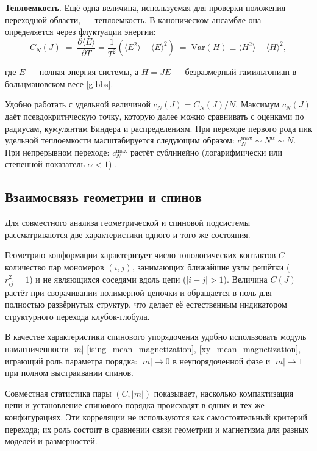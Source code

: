  
    \textbf{Теплоемкость}. 
 Ещё одна величина, используемая для проверки положения переходной области, --- теплоемкость. 
 В каноническом ансамбле она определяется через флуктуации энергии:
     \begin{equation}
 	\label{eq:capacity_heat}
 	C_N(J) \;=\; \frac{\partial \langle E \rangle}{\partial T} = \frac{1}{T^2}
 	\left(
 	\langle E^2\rangle-\langle E\rangle^2
 	\right)
 	\;=\; \mathrm{Var}(H) \equiv \langle H^2\rangle - \langle H\rangle^2, 
 \end{equation} 
 
 где \(E\) — полная энергия системы, а \(H=J E\) — безразмерный
 гамильтониан в больцмановском весе  \eqref{gibbs}.
 
Удобно работать с удельной величиной $c_N(J)=C_N(J)/N$. 
Максимум $c_N(J)$ даёт псевдокритическую точку, которую далее можно сравнивать с оценками по радиусам, кумулянтам Биндера и распределениям. 
При переходе первого рода пик удельной теплоемкости масштабируется следующим образом: 
\(
c_N^{\max}\sim N^{\alpha} \sim N. 
\)   
При  непрерывном переходе:
\(
c_N^{\max}
\)
растёт сублинейно (логарифмически или степенной  показатель $\alpha<1$) \cite{PhysRevB.34.1841,Landau_Binder_2021,PhysRevB.43.3265}. 

\subsection{Взаимосвязь геометрии и спинов}
\label{sec:geom_spin_corr} 

Для совместного анализа геометрической и спиновой подсистемы рассматриваются две характеристики одного и того же состояния. 

Геометрию конформации характеризует число топологических контактов $C$ --- количество пар
мономеров $(i,j)$, занимающих ближайшие узлы решётки
($r_{ij}^2 = 1$) и не являющихся соседями вдоль цепи ($|i-j|>1$).   
Величина $C(J)$ растёт при сворачивании полимерной цепочки  и обращается в ноль
для полностью развёрнутых структур, что делает её естественным
индикатором структурного перехода клубок-глобула. 

 В качестве характеристики спинового упорядочения  удобно использовать модуль намагниченности
$|m|$ \eqref{ising_mean_magnetization}, \eqref{xy_mean_magnetization},
играющий роль параметра порядка: $|m|\to 0$ в неупорядоченной фазе
и $|m|\to 1$ при полном выстраивании спинов.  


 Совместная статистика пары $(C, |m|)$ показывает, насколько компактизация цепи и установление спинового порядка происходят в одних и тех же конфигурациях. 
 Эти корреляции не используются как самостоятельный критерий перехода; их роль состоит в сравнении связи геометрии и магнетизма для разных моделей и размерностей.

